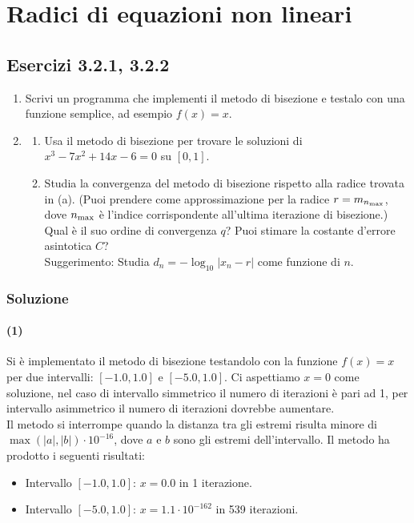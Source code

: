 \documentclass[letterpaper, 12pt]{article}
\numberwithin{equation}{section}    %
\begin{document}
\section{Radici di equazioni non lineari}
\subsection{Esercizi 3.2.1, 3.2.2}

\begin{enumerate}
    \item Scrivi un programma che implementi il metodo di bisezione e testalo con una funzione semplice, ad esempio $f(x)=x$.
    \item 
    \begin{enumerate}
        \item Usa il metodo di bisezione per trovare le soluzioni di $x^3 - 7x^2 + 14x - 6 = 0$ su $[0,1]$.
        \item Studia la convergenza del metodo di bisezione rispetto alla radice trovata in (a). (Puoi prendere come approssimazione per la radice $r=m_{n_{\rm max}}$, dove $n_{\rm max}$ è l'indice corrispondente all'ultima iterazione di bisezione.) \\
        Qual è il suo ordine di convergenza $q$? Puoi stimare la costante d'errore asintotica $C$? \\
        Suggerimento: Studia $d_n=-\log_{10}|x_{n}-r|$ come funzione di $n$.
    \end{enumerate}
\end{enumerate}

\subsubsection{Soluzione}
\paragraph{(1)}Si è implementato il metodo di bisezione testandolo con la funzione $f(x)=x$ per due 
intervalli: $[-1.0, 1.0]$ e $[-5.0, 1.0]$. Ci aspettiamo 
$x = 0$ come soluzione, nel caso di intervallo simmetrico il numero di iterazioni 
è pari ad 1, per intervallo asimmetrico il numero di iterazioni dovrebbe aumentare. \\
Il metodo si interrompe quando la distanza tra gli estremi risulta minore di $\max(|a|,|b|) \cdot 10^{-16}$,
dove $a$ e $b$ sono gli estremi dell'intervallo. Il metodo ha prodotto i seguenti risultati:
\begin{itemize}
    \item Intervallo $[-1.0, 1.0]$: $x = 0.0$ in 1 iterazione.
    \item Intervallo $[-5.0, 1.0]$: $x = 1.1 \cdot 10^{-162}$ in 539 iterazioni.
\end{itemize}
\end{document}
